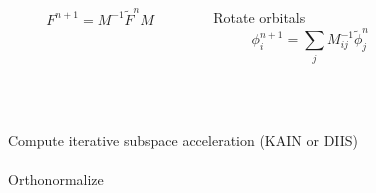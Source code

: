 \documentclass[mathserif, 10pt]{beamer}
\begin{document}
\begin{frame}
{\begin{columns}
\begin{column}[b]{0.4\textwidth}
    \begin{equation}
	\nonumber
	F^{n+1} = M^{-1}\tilde{F}^nM
    \end{equation}
    \end{column}
    \begin{column}[b]{0.4\textwidth}
    \centering
    Rotate orbitals
    \begin{equation}
	\nonumber
	\phi_i^{n+1} = \sum_jM^{-1}_{ij}\tilde{\phi}_j^n
    \end{equation}
    \end{column}
    \begin{column}[b]{0.1\textwidth}
    \ \\
    \end{column}
    \end{columns}
    \ \\
    \ \\
    \pause
    Compute iterative subspace acceleration (KAIN or DIIS)\\
    \ \\
    Orthonormalize\\
    \ \\
    }
\end{frame}
\end{document}
